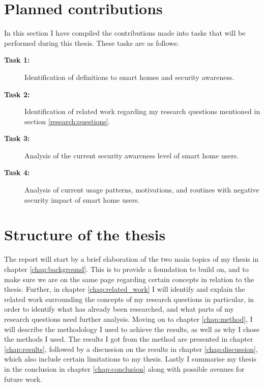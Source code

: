 \section{Planned contributions}
In this section I have compiled the contributions made into tasks that will be performed during this thesis. These tasks are as follows:
\begin{description}
    \item[\textbf{Task 1:}] Identification of definitions to smart homes and security awareness. 
    \item[\textbf{Task 2:}] Identification of related work regarding my research questions mentioned in section \ref{research:questions}. 
    \item[\textbf{Task 3:}] Analysis of the current security awareness level of smart home users.
    \item[\textbf{Task 4:}] Analysis of current usage patterns, motivations, and routines with negative security impact of smart home users.
\end{description}

\section{Structure of the thesis}
The report will start by a brief elaboration of the two main topics of my thesis in chapter \ref{chap:background}. This is to provide a foundation to build on, and to make sure we are on the same page regarding certain concepts in relation to the thesis. Further, in chapter \ref{chap:related_work} I will identify and explain the related work surrounding the concepts of my research questions in particular, in order to identify what has already been researched, and what parts of my research questions need further analysis. Moving on to chapter \ref{chap:method}, I will describe the methodology I used to achieve the results, as well as why I chose the methods I used. The results I got from the method are presented in chapter \ref{chap:results}, followed by a discussion on the results in chapter \ref{chap:discussion}, which also include certain limitations to my thesis. Lastly I summarise my thesis in the conclusion in chapter \ref{chap:conclusion} along with possible avenues for future work. 

